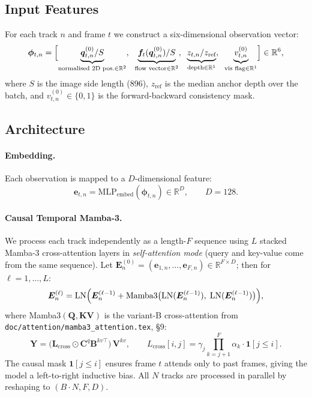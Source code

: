 \documentclass[11pt,a4paper]{article}
\begin{document}
\subsection{Input Features}

For each track $n$ and frame $t$ we construct a six-dimensional
observation vector:
\begin{equation}\label{eq:phi}
  \bm{\phi}_{t,n} =
  \Bigl[
    \underbrace{\bm{q}_{t,n}^{(0)} / S}_{\text{normalised 2D pos.} \in \mathbb{R}^2},\;\;
    \underbrace{\bm{f}_t(\bm{q}_{t,n}^{(0)}) / S}_{\text{flow vector} \in \mathbb{R}^2},\;\;
    \underbrace{z_{t,n} / z_{\text{ref}}}_{\text{depth} \in \mathbb{R}^1},\;\;
    \underbrace{v_{t,n}^{(0)}}_{\text{vis flag} \in \mathbb{R}^1}
  \Bigr] \in \mathbb{R}^6,
\end{equation}
where $S$ is the image side length (896), $z_{\text{ref}}$ is the
median anchor depth over the batch, and $v_{t,n}^{(0)} \in \{0,1\}$
is the forward-backward consistency mask.

\subsection{Architecture}

\paragraph{Embedding.}
Each observation is mapped to a $D$-dimensional feature:
\begin{equation}
  \bm{e}_{t,n} = \mathrm{MLP}_\mathrm{embed}(\bm{\phi}_{t,n}) \in \mathbb{R}^D,
  \qquad D = 128.
\end{equation}

\paragraph{Causal Temporal Mamba-3.}
We process each track independently as a length-$F$ sequence using $L$
stacked Mamba-3 cross-attention layers in \emph{self-attention mode}
(query and key-value come from the same sequence). Let
$\bm{E}^{(0)}_n = (\bm{e}_{1,n}, \dots, \bm{e}_{F,n}) \in \mathbb{R}^{F \times D}$;
then for $\ell = 1, \dots, L$:
\begin{equation}\label{eq:mamba}
  \bm{E}^{(\ell)}_n = \mathrm{LN}\Bigl(
    \bm{E}^{(\ell-1)}_n + \mathrm{Mamba3}\bigl(
      \mathrm{LN}(\bm{E}^{(\ell-1)}_n),\;
      \mathrm{LN}(\bm{E}^{(\ell-1)}_n)
    \bigr)
  \Bigr),
\end{equation}
where Mamba3$(\bm{Q}, \bm{KV})$ is the variant-B cross-attention from
\texttt{doc/attention/mamba3\_attention.tex}, \S 9:
\begin{equation}
  \bm{Y} = \bigl(\bm{L}_\mathrm{cross} \odot \bm{C}^q \bm{B}^{kv\top}\bigr)\,\bm{V}^{kv},
  \qquad
  L_\mathrm{cross}[i,j] = \gamma_j \prod_{k=j+1}^{F} \alpha_k \cdot \mathbf{1}[j \leq i].
\end{equation}
The causal mask $\mathbf{1}[j \leq i]$ ensures frame $t$ attends only
to past frames, giving the model a left-to-right inductive bias.
All $N$ tracks are processed in parallel by reshaping to $(B \cdot N, F, D)$.
\end{document}
